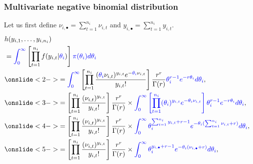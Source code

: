 \documentclass[ignorenonframetext,]{beamer}
\begin{document}
\begin{frame}[t]
\frametitle{Multivariate negative binomial distribution}
\footnotesize

Let us first define $\nu_{i,\bullet} = \sum_{t=1}^{n_i} \nu_{i,t}$ and $y_{i,\bullet} = \sum_{t=1}^{n_i} y_{i,t}$.
\setlength{\abovedisplayskip}{4pt}\setlength{\jot}{2pt}
\begin{align*}
& h(y_{i,1}, \ldots, y_{i,n_i}) \\
&= {\color{blue}\int_0^\infty} \left[ \prod_{t=1}^{n_i} f(y_{i,t}|{\color{blue}\theta_i}) \right] {\color{blue}\pi(\theta_i) d\theta_i} \\
& \onslide<2->{= {\color{blue}\int_0^\infty} \left[ \prod_{t=1}^{n_i} \frac{({\color{blue}\theta_i} \nu_{i,t})^{y_{i,t}} e^{-{\color{blue}\theta_i} \nu_{i,t}}}{y_{i,t}!} \right] \frac{r^r}{\Gamma(r)} {\color{blue}\theta_i^{r-1} e^{-r\theta_i} d\theta_i},} \\
& \onslide<3->{= \left[ \prod_{t=1}^{n_i} \frac{(\nu_{i,t})^{y_{i,t}}}{y_{i,t}!} \right] \frac{r^r}{\Gamma(r)} \times {\color{blue}\int_0^\infty \left[ \prod_{t=1}^{n_i} (\theta_i)^{y_{i,t}} e^{-\theta_i \nu_{i,t}} \right] \theta_i^{r-1} e^{-r\theta_i} d\theta_i},} \\
& \onslide<4->{= \left[ \prod_{t=1}^{n_i} \frac{(\nu_{i,t})^{y_{i,t}}}{y_{i,t}!} \right] \frac{r^r}{\Gamma(r)} \times {\color{blue}\int_0^\infty \theta_i^{\sum_{t=1}^{n_i} y_{i,t} + r - 1} e^{-\theta_i (\sum_{t=1}^{n_i} \nu_{i,t} + r)} d\theta_i},} \\
& \onslide<5->{= \left[ \prod_{t=1}^{n_i} \frac{(\nu_{i,t})^{y_{i,t}}}{y_{i,t}!} \right] \frac{r^r}{\Gamma(r)} \times {\color{blue}\int_0^\infty \theta_i^{y_{i,\bullet} + r - 1} e^{-\theta_i (\nu_{i,\bullet} + r)} d\theta_i},}
\end{align*}

\end{frame}
\end{document}
